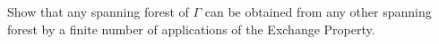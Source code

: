 Show that any spanning forest of $\Gamma$ can be obtained from any other spanning forest by a finite number of applications of the Exchange Property.
